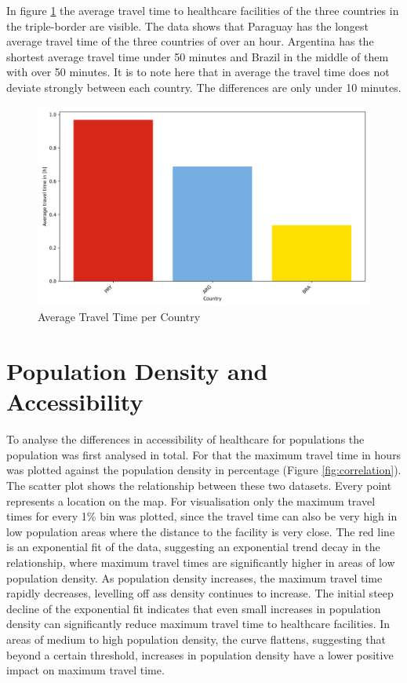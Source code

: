 \documentclass[11pt, a4paper]{report}
\begin{document}
In figure \ref{fig:traveltimecountriesplot} the average travel time to healthcare facilities of the three countries in the triple-border are visible. The data shows that Paraguay has the longest average travel time of the three countries of over an hour. Argentina has the shortest average travel time under 50 minutes and Brazil in the middle of them with over 50 minutes. It is to note here that in average the travel time does not deviate strongly between each country. The differences are only under 10 minutes.

\begin{figure}[H]
  \centering
  \includegraphics[width=0.9\linewidth]{figures/countries.png}
  \caption{Average Travel Time per Country}
  \label{fig:traveltimecountriesplot}
\end{figure}

\section{Population Density and Accessibility}\label{sec:results:popdens}
To analyse the differences in accessibility of healthcare for populations the population was first analysed in total. For that the maximum travel time in hours was plotted against the population density in percentage (Figure \ref{fig:correlation}). The scatter plot shows the relationship between these two datasets. Every point represents a location on the map. For visualisation only the maximum travel times for every 1\% bin was plotted, since the travel time can also be very high in low population areas where the distance to the facility is very close. The red line is an exponential fit of the data, suggesting an exponential trend decay in the relationship, where maximum travel times are significantly higher in areas of low population density. As population density increases, the maximum travel time rapidly decreases, levelling off ass density continues to increase. The initial steep decline of the exponential fit indicates that even small increases in population density can significantly reduce maximum travel time to healthcare facilities. In areas of medium to high population density, the curve flattens, suggesting that beyond a certain threshold, increases in population density have a lower positive impact on maximum travel time.
\end{document}
